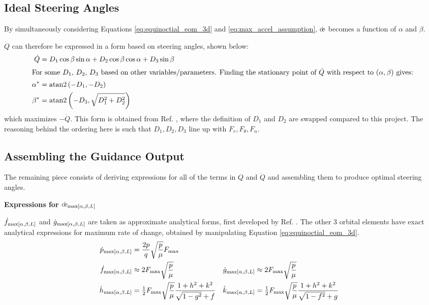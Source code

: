 \subsection{Ideal Steering Angles}
By simultaneously considering Equations \ref{eq:equinoctial_eom_3d} and \ref{eq:max_accel_assumption}, \(\dot{\moe}\) becomes a function of \(\alpha\) and \(\beta\).

\(\dot{Q}\) can therefore be expressed in a form based on steering angles, shown below:
\begin{align}
  \dot{Q}  & = D_1 \cos \beta \sin \alpha + D_2 \cos \beta \cos \alpha + D_3 \sin \beta \label{eq:q_dot_angles_form} \\
  \intertext{For some \(D_1\), \(D_2\), \(D_3\) based on other variables/parameters. Finding the stationary point of \(\dot{Q}\) with respect to \((\alpha, \beta)\) gives:}
  \alpha^* & = \mathrm{atan2}\left(-D_1, -D_2\right) \label{eq:alpha_star}                                           \\
  \beta^*  & = \mathrm{atan2}\left(-D_3, \sqrt{D_1^2 + D_2^2}\right) \label{eq:beta_star}
\end{align}
which maximizes \(-\dot{Q}\). This form is obtained from Ref. \cite{vargaperez2016}, where the definition of \(D_1\) and \(D_2\) are swapped compared to this project. The reasoning behind the ordering here is such that \(D_1, D_2, D_3\) line up with \(F_r, F_\theta, F_n\).

\subsection{Assembling the Guidance Output}
The remaining piece consists of deriving expressions for all of the terms in \(Q\) and \(\dot{Q}\) and assembling them to produce optimal steering angles.

\textbf{Expressions for \(\dot{\moe}_{\maxrocall}\)}

\(\dot{f}_{\text{max}[\alpha, \beta, L]}\) and \(\dot{g}_{\text{max}[\alpha, \beta, L]}\) are taken as approximate analytical forms, first developed by Ref. \cite{vargaperez2016}. The other 3 orbital elements have exact analytical expressions for maximum rate of change, obtained by manipulating Equation \ref{eq:equinoctial_eom_3d}.
\begin{align*}
  \dot{p}_{\text{max}[\alpha, \beta, L]} & = \frac{2p}{q} \sqrt{\frac{p}{\mu}} F_{\max}                                   \\
  \dot{f}_{\text{max}[\alpha, \beta, L]} & \approx 2F_{\max} \sqrt{\frac{p}{\mu}}                                       &
  \dot{g}_{\text{max}[\alpha, \beta, L]} & \approx 2F_{\max} \sqrt{\frac{p}{\mu}}                                         \\
  \dot{h}_{\text{max}[\alpha, \beta, L]} & = \tfrac{1}{2}F_{\max} \sqrt{\frac{p}{\mu}} \frac{1+h^2+k^2}{\sqrt{1-g^2}+f} &
  \dot{k}_{\text{max}[\alpha, \beta, L]} & = \tfrac{1}{2}F_{\max} \sqrt{\frac{p}{\mu}}\frac{1+h^2+k^2}{\sqrt{1-f^2}+g}
\end{align*}

